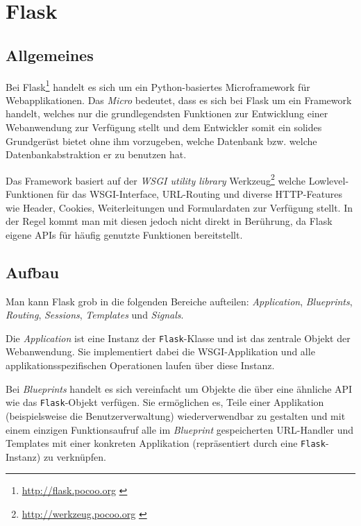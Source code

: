 \chapter{Flask}
\section{Allgemeines}

Bei Flask\footnote{\href{http://flask.pocoo.org}{http://flask.pocoo.org} \citep{flask}} handelt es sich um ein
Python-basiertes Microframework für Webapplikationen. Das \emph{Micro} bedeutet, dass es sich bei
Flask um ein Framework handelt, welches nur die grundlegendsten Funktionen zur Entwicklung einer
Webanwendung zur Verfügung stellt und dem Entwickler somit ein solides Grundgerüst bietet ohne ihm
vorzugeben, welche Datenbank bzw. welche Datenbankabstraktion er zu benutzen hat.

Das Framework basiert auf der \emph{WSGI utility library}
Werkzeug\footnote{\href{http://werkzeug.pocoo.org}{http://werkzeug.pocoo.org} \citep{werkzeug}} welche
Lowlevel-Funktionen für das WSGI-Interface, URL-Routing und diverse HTTP-Features wie Header,
Cookies, Weiterleitungen und Formulardaten zur Verfügung stellt. In der Regel kommt man mit diesen
jedoch nicht direkt in Berührung, da Flask eigene APIs für häufig genutzte Funktionen bereitstellt.

\section{Aufbau}

Man kann Flask grob in die folgenden Bereiche aufteilen: \emph{Application}, \emph{Blueprints},
\emph{Routing}, \emph{Sessions}, \emph{Templates} und \emph{Signals}.

Die \emph{Application} ist eine Instanz der \lstinline{Flask}-Klasse und ist das zentrale Objekt der
Webanwendung. Sie implementiert dabei die WSGI-Applikation und alle applikationsspezifischen
Operationen laufen über diese Instanz.

Bei \emph{Blueprints} handelt es sich vereinfacht um Objekte die über eine ähnliche API wie das
\lstinline{Flask}-Objekt verfügen. Sie ermöglichen es, Teile einer Applikation (beispielsweise die
Benutzerverwaltung) wiederverwendbar zu gestalten und mit einem einzigen Funktionsaufruf alle im
\emph{Blueprint} gespeicherten URL-Handler und Templates mit einer konkreten Applikation
(repräsentiert durch eine \lstinline{Flask}-Instanz) zu verknüpfen.

